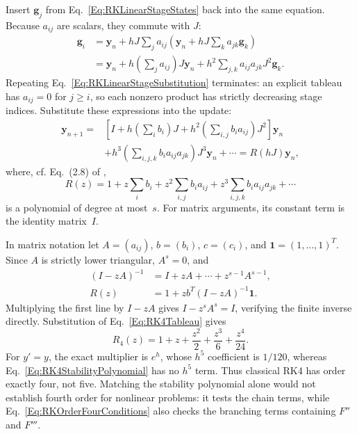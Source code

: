 Insert $\mathbf g_j$ from Eq.~\ref{Eq:RKLinearStageStates} back into
the same equation. Because $a_{ij}$ are scalars, they commute with $J$:
\begin{align}
 \mathbf g_i
 &=\mathbf y_n+hJ\sum_j a_{ij}
       \left(\mathbf y_n+hJ\sum_k a_{jk}\mathbf g_k\right)\nonumber\\
 &=\mathbf y_n+h\left(\sum_j a_{ij}\right)J\mathbf y_n
       +h^2\sum_{j,k}a_{ij}a_{jk}J^2\mathbf g_k.\label{Eq:RKLinearStageSubstitution}
\end{align}
Repeating Eq.~\ref{Eq:RKLinearStageSubstitution} terminates: an explicit
tableau has $a_{ij}=0$ for $j\geq i$, so each nonzero product has strictly
decreasing stage indices. Substitute these expressions into the update:
\begin{equation}\label{Eq:RKLinearUpdateExpansion}
\begin{aligned}
 \mathbf y_{n+1}={}&\left[I+h\left(\sum_i b_i\right)J
       +h^2\left(\sum_{i,j}b_i a_{ij}\right)J^2\right]\mathbf y_n\\
 &+h^3\left(\sum_{i,j,k}b_i a_{ij}a_{jk}\right)J^3\mathbf y_n+\cdots
 =R(hJ)\mathbf y_n,
\end{aligned}
\end{equation}
where, cf. Eq.~(2.8) of \cite{HaWa2010},
\begin{equation}\label{Eq:RKStabilityPolynomial}
 R(z)=1+z\sum_i b_i+z^2\sum_{i,j}b_i a_{ij}
                    +z^3\sum_{i,j,k}b_i a_{ij}a_{jk}+\cdots
\end{equation}
is a polynomial of degree at most~$s$. For matrix arguments, its constant
term is the identity matrix~$I$.

In matrix notation let $A=(a_{ij})$, $b=(b_i)$,
$c=(c_i)$, and $\mathbf1=(1,\dots,1)^T$. Since $A$ is strictly lower
triangular, $A^s=0$, and
\begin{equation}\label{Eq:RKStabilityPolynomialMatrix}
\begin{aligned}
 (I-zA)^{-1}&=I+zA+\cdots+z^{s-1}A^{s-1},\\
 R(z)&=1+zb^T(I-zA)^{-1}\mathbf1.
\end{aligned}
\end{equation}
Multiplying the first line by $I-zA$ gives $I-z^sA^s=I$, verifying the
finite inverse directly. Substitution of Eq.~\ref{Eq:RK4Tableau} gives
\begin{equation}\label{Eq:RK4StabilityPolynomial}
 R_4(z)=1+z+\frac{z^2}{2}+\frac{z^3}{6}+\frac{z^4}{24}.
\end{equation}
For $y'=y$, the exact multiplier is $e^h$, whose $h^5$ coefficient is
$1/120$, whereas Eq.~\ref{Eq:RK4StabilityPolynomial} has no $h^5$ term.
Thus classical RK4 has order exactly four, not five. Matching the stability
polynomial alone would not establish fourth order for nonlinear problems:
it tests the chain terms, while Eq.~\ref{Eq:RKOrderFourConditions} also
checks the branching terms containing $F''$ and $F'''$.

